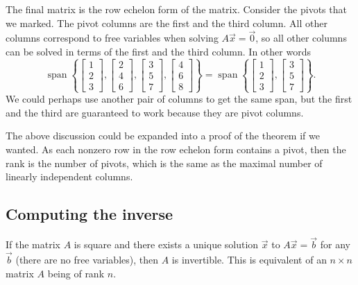 The final matrix is the row echelon form of the matrix.
Consider the pivots that we marked.
The pivot columns are the first and the third
column.  All other columns correspond to free variables when solving
$A \vec{x} = \vec{0}$, so all other columns can be solved in terms of the first and
the third column.  In other words
\begin{equation*}
\operatorname{span}
\left\{
\begin{bmatrix}
1 \\
2 \\
3 
\end{bmatrix}
,
\begin{bmatrix}
2 \\
4 \\
6
\end{bmatrix}
,
\begin{bmatrix}
3 \\
5 \\
7
\end{bmatrix}
,
\begin{bmatrix}
4 \\
6 \\
8
\end{bmatrix}
\right\}
=
\operatorname{span}
\left\{
\begin{bmatrix}
1 \\
2 \\
3
\end{bmatrix}
,
\begin{bmatrix}
3 \\
5 \\
7
\end{bmatrix}
\right\} .
\end{equation*}
We could perhaps use another pair of columns to get the same span, but the
first and the third are guaranteed to work because they are pivot columns.

The above discussion could be expanded into a proof of the theorem if
we wanted.
As each nonzero row
in the row echelon form contains a pivot, then the rank is the number of
pivots, which is the same as the maximal number of linearly independent
columns.

\subsection{Computing the inverse}

If the matrix $A$ is square and there exists a unique solution
$\vec{x}$ to $A \vec{x} = \vec{b}$ for any $\vec{b}$ (there are no free
variables), then $A$ is invertible.
This is equivalent of an $n \times n$ matrix $A$ being of rank $n$.

